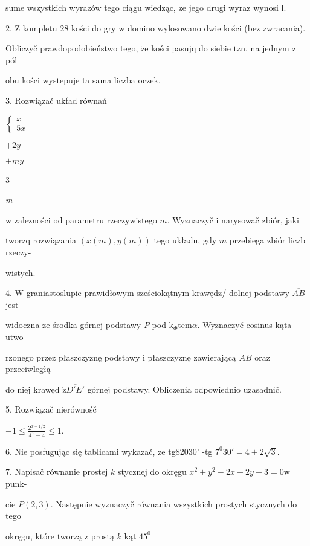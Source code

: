 \documentclass[a4paper,12pt]{article}
\begin{document}
sume wszystkich wyrazów tego ciągu wiedząc, $\dot{\mathrm{z}}\mathrm{e}$ jego drugi wyraz wynosi l.

2. $\mathrm{Z}$ kompletu 28 kości do gry $\mathrm{w}$ domino wylosowano dwie kości (bez zwracania).

Obliczyč prawdopodobieństwo tego, $\dot{\mathrm{z}}\mathrm{e}$ kości pasujq do siebie $\mathrm{t}\mathrm{z}\mathrm{n}$. na jednym $\mathrm{z}$ pól

obu kości wystepuje ta sama liczba oczek.

3. Rozwiązač ukfad równań

$\left\{\begin{array}{l}
x\\
5x
\end{array}\right.$

$+2y$

$+my$

3

{\it m}

$\mathrm{w}$ zalezności od parametru rzeczywistego $m$. Wyznaczyč $\mathrm{i}$ narysowač zbiór, jaki

tworzq rozwiązania $(x(m),y(m))$ tego układu, gdy $m$ przebiega zbiór liczb rzeczy-

wistych.

4. $\mathrm{W}$ graniastoslupie prawidłowym sześciokątnym krawędz/ dolnej podstawy $\overline{AB}$ jest

widoczna ze środka górnej podstawy $P$ pod $\mathrm{k}_{\Phi}\mathrm{t}\mathrm{e}\mathrm{m}\alpha$. Wyznaczyč cosinus kąta utwo-

rzonego przez płaszczyznę podstawy $\mathrm{i}$ płaszczyznę zawierającą $\overline{AB}$ oraz przeciwległą

do niej krawęd $\acute{\mathrm{z}}\overline{D'E'}$ górnej podstawy. Obliczenia odpowiednio uzasadnič.

5. Rozwiązač nierównośč

$-1\displaystyle \leq\frac{2^{x+1/2}}{4^{x}-4}\leq 1.$

6. Nie posfugując się tablicami wykazač, $\dot{\mathrm{z}}\mathrm{e}$ tg82030' -tg $7^{0}30'=4+2\sqrt{3}.$

7. Napisač równanie prostej $k$ stycznej do okręgu $x^{2}+y^{2}-2x-2y-3=0\mathrm{w}$ punk-

cie $P(2,3)$. Następnie wyznaczyč równania wszystkich prostych stycznych do tego

okręgu, które tworzą $\mathrm{z}$ prostą $k$ kąt $45^{0}$
\end{document}
